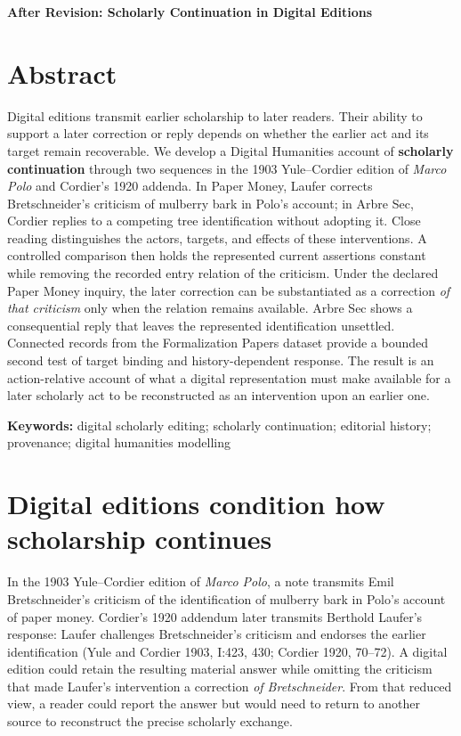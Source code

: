\documentclass[11pt,a4paper]{article}
\begin{document}
\begin{center}
{\LARGE\bfseries After Revision: Scholarly Continuation in Digital Editions\par}
\vspace{0.7em}
\end{center}
\vspace{1em}


\section*{Abstract}

Digital editions transmit earlier scholarship to later readers. Their ability to support a later correction or reply depends on whether the earlier act and its target remain recoverable. We develop a Digital Humanities account of \textbf{scholarly continuation} through two sequences in the 1903 Yule–Cordier edition of \emph{Marco Polo} and Cordier's 1920 addenda. In Paper Money, Laufer corrects Bretschneider's criticism of mulberry bark in Polo's account; in Arbre Sec, Cordier replies to a competing tree identification without adopting it. Close reading distinguishes the actors, targets, and effects of these interventions. A controlled comparison then holds the represented current assertions constant while removing the recorded entry relation of the criticism. Under the declared Paper Money inquiry, the later correction can be substantiated as a correction \emph{of that criticism} only when the relation remains available. Arbre Sec shows a consequential reply that leaves the represented identification unsettled. Connected records from the Formalization Papers dataset provide a bounded second test of target binding and history-dependent response. The result is an action-relative account of what a digital representation must make available for a later scholarly act to be reconstructed as an intervention upon an earlier one.


\textbf{Keywords:} digital scholarly editing; scholarly continuation; editorial history; provenance; digital humanities modelling


\section{Digital editions condition how scholarship continues}

In the 1903 Yule–Cordier edition of \emph{Marco Polo}, a note transmits Emil Bretschneider's criticism of the identification of mulberry bark in Polo's account of paper money. Cordier's 1920 addendum later transmits Berthold Laufer's response: Laufer challenges Bretschneider's criticism and endorses the earlier identification (Yule and Cordier 1903, I:423, 430; Cordier 1920, 70–72). A digital edition could retain the resulting material answer while omitting the criticism that made Laufer's intervention a correction \emph{of Bretschneider}. From that reduced view, a reader could report the answer but would need to return to another source to reconstruct the precise scholarly exchange.
\end{document}
